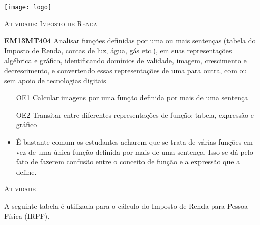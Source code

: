 \documentclass[10 pt,usenames,dvipsnames, oneside]{article}
\begin{document}
\begin{center}
  \begin{minipage}[l]{3cm}
\texttt{[image: logo]}    
\end{minipage}\hfill
\begin{minipage}[r]{.8\textwidth}
 {\Large \scshape Atividade: Imposto de Renda}  
\end{minipage}
\end{center}
\vspace{.2cm}

\ifdefined\prof
\begin{objetivos}
\item \textbf{EM13MT404} Analisar funções definidas por uma ou mais sentenças (tabela do Imposto de Renda, contas de luz, água, gás etc.), em suas representações algébrica e gráfica, identificando domínios de validade, imagem, crescimento e decrescimento, e convertendo essas representações de uma para outra, com ou sem apoio de tecnologias digitais
\end{objetivos}

\begin{goals}
\begin{enumerate}

\item [OE1] Calcular imagens por uma função definida por mais de uma sentença

\item [OE2] Transitar entre diferentes representações de função: tabela, expressão e gráfico

\end{enumerate}

\tcblower

\begin{itemize}
\item É bastante comum os estudantes acharem que se trata de várias funções em vez de uma única função definida por mais de uma sentença. Isso se dá pelo fato de fazerem confusão entre o conceito de função e a expressão que a define.
\end{itemize}

\end{goals}

\bigskip
\begin{center}
{\large \scshape Atividade}
\end{center}
\fi

A seguinte tabela é utilizada para o cálculo do Imposto de Renda para Pessoa Física (IRPF).
\end{document}
